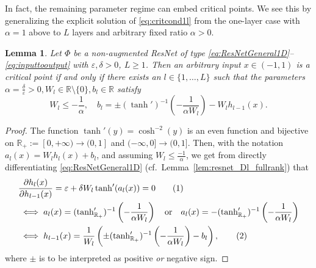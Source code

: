 \documentclass[10pt]{article}
\newcommand\numberthis{\addtocounter{equation}{1}\tag{\theequation}}
\newtheorem{lemma}[theorem]{Lemma}
\theoremstyle{definition}
\numberwithin{equation}{section}
\newcommand{\eps}{\varepsilon}
\newcommand{\R}{\mathbb{R}}
\begin{document}
    In fact, the remaining parameter regime can embed critical points. We see this by generalizing the explicit solution of \eqref{eq:critcond1l} from the one-layer case with $\alpha = 1$ above to $L$ layers and arbitrary fixed ratio $\alpha>0$.
\begin{lemma}\label{lem:b0condition}
      Let $\Phi$ be a non-augmented ResNet of type \eqref{eq:ResNetGeneral1D}--\eqref{eq:inputtooutput} with $\eps, \delta > 0$, $L\ge 1$. Then an arbitrary input $x\in (-1,1)$ is a critical point if and only if there exists an $l \in \{1, \ldots, L\}$ such that the parameters $\alpha = \frac{\delta}{\eps} > 0, W_l \in \R\setminus\{0\}, b_l\in \R$ satisfy
\begin{equation}
W_l  \leq -\frac{1}{\alpha},\quad  b_l = \pm(\tanh')^{-1}\left(-\frac{1}{\alpha W_l}\right) - W_l h_{l-1}(x).
\label{eq:blcondition}
\end{equation}
\end{lemma}
\begin{proof}
   The function $\tanh'(y) = \cosh^{-2}(y)$ is an even function and bijective on $\R_{+}:=[0,+\infty)\to (0,1]$ and $(-\infty,0] \to
    (0,1]$. Then, with the notation $a_l(x)=W_l h_l(x) + b_l$, and assuming $W_l \leq \frac{-1}{\alpha}$, we get from directly differentiating \eqref{eq:ResNetGeneral1D} (cf.\ Lemma~\ref{lem:resnet_Dl_fullrank}) that
        \begin{align*}
          &\frac{\partial h_{l}(x)}{\partial h_{l-1}(x)} =  \eps + \delta W_l\tanh'(a_l(x)) = 0  \numberthis \label{eq:hlprime}\\
          &\iff  a_l(x) = (\tanh'_{\R_+})^{-1}\left(-\frac{1}{\alpha W_l}\right) \quad \text{or} \quad a_l(x) = -(\tanh'_{\R_+})^{-1}\left(-\frac{1}{\alpha W_l}\right) \\
         &\iff   h_{l-1}(x) =\frac{1}{W_l} \left(\pm (\tanh'_{\R_+})^{-1}\left(-\frac{1}{\alpha W_l}\right) - b_l \right),\numberthis \label{eq:hlcondition}
    \end{align*}
    where $\pm$ is to be interpreted as positive \emph{or} negative sign.
\end{proof}
\end{document}
